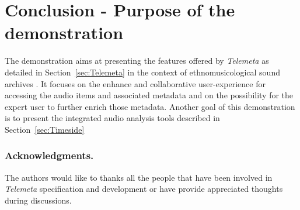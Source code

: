 \documentclass[runningheads,a4paper]{llncs}
\begin{document}
\section{Conclusion - Purpose of the demonstration}
The demonstration aims at presenting the features offered by \emph{Telemeta} as detailed in Section~\ref{sec:Telemeta} in the context of ethnomusicological sound archives \cite{telemetaCREM}. It focuses on the enhance and collaborative user-experience for accessing the audio items and associated metadata and on the possibility for the expert user to further enrich those metadata.
Another goal of this demonstration is to present the integrated audio analysis tools described in Section~\ref{sec:Timeside}


\subsubsection*{Acknowledgments.} 
The authors would like to thanks all the people that have been involved in \emph{Telemeta} specification and development or have provide appreciated thoughts during discussions.





\end{document}
